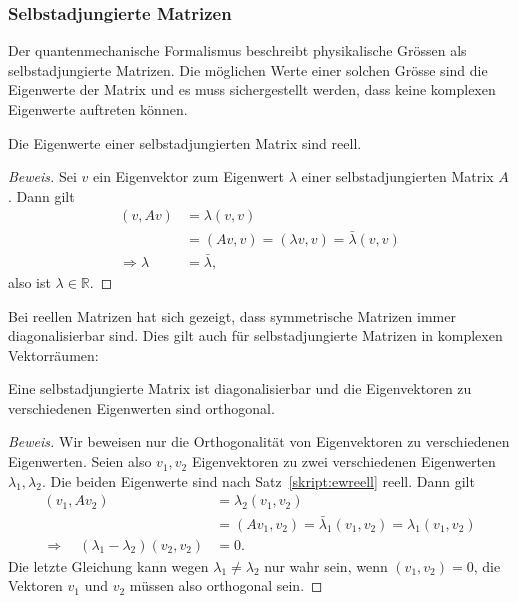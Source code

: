 \subsubsection{Selbstadjungierte Matrizen}
Der quantenmechanische Formalismus beschreibt physikalische Grössen
als selbstadjungierte Matrizen. Die möglichen Werte einer solchen Grösse
sind die Eigenwerte der Matrix und es muss sichergestellt werden,
dass keine komplexen Eigenwerte auftreten können.

\begin{satz}
\label{skript:ewreell}
Die Eigenwerte einer selbstadjungierten Matrix sind reell.
\end{satz}
\begin{proof}[Beweis]
Sei $v$ ein Eigenvektor zum Eigenwert $\lambda$ einer selbstadjungierten
Matrix $A$. Dann gilt
\begin{align*}
(v,Av)
&=
\lambda(v,v)
\\
&=(Av,v)=(\lambda v,v)=\bar\lambda(v,v)
\\
\Rightarrow \lambda&=\bar\lambda,
\end{align*}
also ist $\lambda\in\mathbb R$.
\end{proof}

Bei reellen Matrizen hat sich gezeigt, dass symmetrische Matrizen immer
diagonalisierbar sind. Dies gilt auch für selbstadjungierte Matrizen
in komplexen Vektorräumen:

\begin{satz}
\label{skript:evorthogonal}
Eine selbstadjungierte Matrix ist diagonalisierbar und die Eigenvektoren zu
verschiedenen Eigenwerten sind orthogonal.
\end{satz}

\begin{proof}[Beweis]
Wir beweisen nur die Orthogonalität von Eigenvektoren zu verschiedenen 
Eigenwerten. Seien also $v_1,v_2$ Eigenvektoren zu zwei verschiedenen
Eigenwerten $\lambda_1,\lambda_2$. Die beiden Eigenwerte sind nach
Satz~\ref{skript:ewreell} reell. Dann gilt
\begin{align*}
(v_1,Av_2)&=\lambda_2(v_1,v_2)
\\
          &=(Av_1,v_2)=\bar\lambda_1(v_1,v_2)=\lambda_1(v_1,v_2)
\\
\Rightarrow\quad
(\lambda_1-\lambda_2)(v_2,v_2)&=0.
\end{align*}
Die letzte Gleichung kann wegen $\lambda_1\ne\lambda_2$ nur wahr sein,
wenn $(v_1,v_2)=0$, die Vektoren $v_1$ und $v_2$ müssen also orthogonal sein.
\end{proof}


